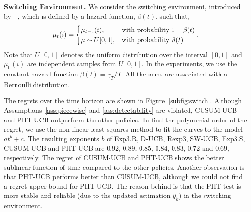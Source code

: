\documentclass[letterpaper]{article} %
\newcommand{\blue}{}
\begin{document}
{\bf Switching Environment.}
We consider the switching environment, introduced by~\citeauthor{mellor2013thompson}~, which is defined by a hazard function, $\beta(t)$, such that,
\begin{eqnarray}\label{eqn:switch}
\mu_t(i)=
\begin{cases}
\mu_{t-1}(i), &\text{with probability } 1-\beta(t)\cr
\mu\sim U[0,1], &\text{with probability } \beta(t)
\end{cases}.
\end{eqnarray}
Note that $U[0,1]$ denotes the uniform distribution over the interval $[0,1]$ and $\mu_0(i)$ are independent samples from $U[0,1]$. In the experiments, we use the constant hazard function $\beta(t)=\gamma_T/T$. All the arms are associated with a Bernoulli distribution.

The regrets over the time horizon are shown in
Figure~\ref{subfig:switch}.  Although
Assumptions~\ref{ass:piecewise} and \ref{ass:detectability} are violated, CUSUM-UCB and PHT-UCB outperform the other policies.
{\blue To find the polynomial order of the regret,
we use the non-linear least squares method to fit the curves to the
model $at^b+c$. The
resulting exponents $b$ of Exp3.R, D-UCB, Rexp3, SW-UCB, Exp3.S, CUSUM-UCB and PHT-UCB are
0.92, 0.89, 0.85, 0.84, 0.83, 0.72 and 0.69, respectively.}
The regret of CUSUM-UCB and PHT-UCB shows the better sublinear
function of time compared to the other policies. Another
observation is that PHT-UCB performs better than CUSUM-UCB,
{\blue although we could not find a regret upper bound for
PHT-UCB}. The reason behind is that the PHT test is more stable and
reliable (due to the updated estimation $\hat{y}_k$) in the switching
environment.

\end{document}

